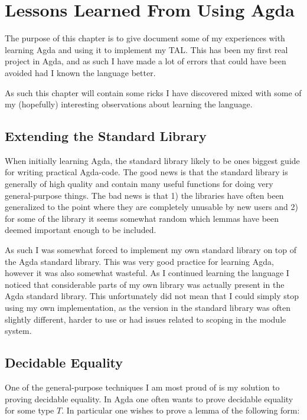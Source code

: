 \chapter{Lessons Learned From Using Agda}
\label{chap:hindsight}

The purpose of this chapter is to give document some of my experiences with
learning Agda and using it to implement my TAL. This has been my first real
project in Agda, and as such I have made a lot of errors that could have been
avoided had I known the language better.

As such this chapter will contain some ricks I have discovered mixed with some
of my (hopefully) interesting observations about learning the language.

\section{Extending the Standard Library}

When initially learning Agda, the standard library likely to be ones biggest
guide for writing practical Agda-code. The good news is that the standard
library is generally of high quality and contain many useful functions for doing
very general-purpose things. The bad news is that 1) the libraries have often
been generalized to the point where they are completely unusable by new users
and 2) for some of the library it seems somewhat random which lemmas have been
deemed important enough to be included.

As such I was somewhat forced to implement my own standard library on top of the
Agda standard library. This was very good practice for learning Agda, however it
was also somewhat wasteful. As I continued learning the language I noticed that
considerable parts of my own library was actually present in the Agda standard
library. This unfortunately did not mean that I could simply stop using my own
implementation, as the version in the standard library was often slightly
different, harder to use or had issues related to scoping in the module system.

\section{Decidable Equality}
\label{sec:deceq}

One of the general-purpose techniques I am most proud of is my solution to
proving decidable equality. In Agda one often wants to prove decidable equality
for some type $T$. In particular one wishes to prove a lemma of the following
form:

